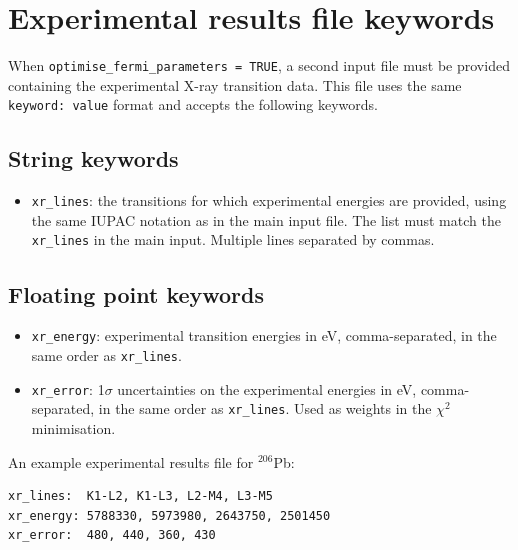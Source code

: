 \documentclass[]{article}
\begin{document}
\section{Experimental results file keywords}\label{APP:expkeyw}

When \texttt{optimise\_fermi\_parameters = TRUE}, a second input file must be provided containing the experimental X-ray transition data. This file uses the same \texttt{keyword: value} format and accepts the following keywords.

\subsection{String keywords}

\begin{itemize}
	\item \texttt{xr\_lines}: the transitions for which experimental energies are provided, using the same IUPAC notation as in the main input file. The list must match the \texttt{xr\_lines} in the main input. Multiple lines separated by commas.
\end{itemize}

\subsection{Floating point keywords}

\begin{itemize}
	\item \texttt{xr\_energy}: experimental transition energies in eV, comma-separated, in the same order as \texttt{xr\_lines}.
	\item \texttt{xr\_error}: 1$\sigma$ uncertainties on the experimental energies in eV, comma-separated, in the same order as \texttt{xr\_lines}. Used as weights in the $\chi^2$ minimisation.
\end{itemize}

\begin{minipage}{\linewidth}
An example experimental results file for $^{206}$Pb:

\begin{verbatim}
xr_lines:  K1-L2, K1-L3, L2-M4, L3-M5
xr_energy: 5788330, 5973980, 2643750, 2501450
xr_error:  480, 440, 360, 430
\end{verbatim}
\end{minipage}
\end{document}
